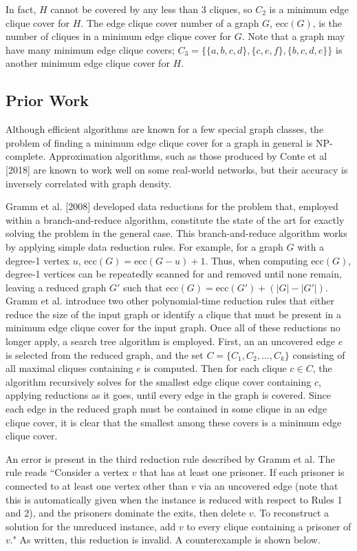 \documentclass[12pt]{article}
\begin{document}
    In fact, $H$ cannot be covered by any less than 3 cliques, so $C_2$ is a minimum edge clique cover for $H$.
    The edge clique cover number of a graph $G$, $\text{ecc}(G)$, is the number of cliques in a minimum edge clique cover for $G$.
    Note that a graph may have many minimum edge clique covers; $C_3 = \{\{a, b, c, d\}, \{c, e, f\}, \{b, c, d, e\}\}$ is another minimum edge clique cover for $H$.

\newpage\subsection*{Prior Work}

    Although efficient algorithms are known for a few special graph classes, the problem of finding a minimum edge clique cover for a graph in general is NP-complete.
    Approximation algorithms, such as those produced by Conte et al [2018] are known to work well on some real-world networks, but their accuracy is inversely correlated with graph density.
    
    Gramm et al. [2008] developed data reductions for the problem that, employed within a branch-and-reduce algorithm, constitute the state of the art for exactly solving the problem in the general case.
    This branch-and-reduce algorithm works by applying simple data reduction rules.
    For example, for a graph $G$ with a degree-1 vertex $u$, $\text{ecc}(G) = \text{ecc}(G - u) + 1$.
    Thus, when computing $\text{ecc}(G)$, degree-1 vertices can be repeatedly scanned for and removed until none remain, leaving a reduced graph $G'$ such that $\text{ecc}(G) = \text{ecc}(G') + (|G| - |G'|)$.
    Gramm et al. introduce two other polynomial-time reduction rules that either reduce the size of the input graph or identify a clique that must be present in a minimum edge clique cover for the input graph.
    Once all of these reductions no longer apply, a search tree algorithm is employed.
    First, an an uncovered edge $e$ is selected from the reduced graph, and the set $C = \{C_1, C_2, \hdots, C_k\}$ consisting of all maximal cliques containing $e$ is computed.
    Then for each clique $c \in C$, the algorithm recursively solves for the smallest edge clique cover containing $c$, applying reductions as it goes, until every edge in the graph is covered.
    Since each edge in the reduced graph must be contained in some clique in an edge clique cover, it is clear that the smallest among these covers is a minimum edge clique cover.

    An error is present in the third reduction rule described by Gramm et al.
    The rule reads ``Consider a vertex $v$ that has at least one prisoner. If each prisoner is connected to at least one vertex other than $v$ via an uncovered edge (note that this is automatically given when the instance is reduced with respect to Rules 1 and 2), and the prisoners dominate the exits, then delete $v$. To reconstruct a solution for the unreduced instance, add $v$ to every clique containing a prisoner of $v$."
    As written, this reduction is invalid.
    A counterexample is shown below.
\end{document}
